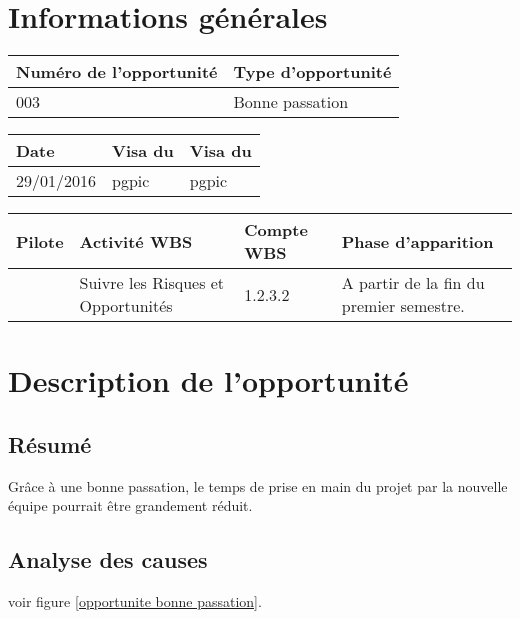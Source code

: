 \section*{Informations générales}
 
\begin{table}[h]
\centering
	\begin{tabularx}{16.8cm}{|X|X|}
	\hline
	\rowcolor{gray!40} Numéro de l'opportunité & Type d'opportunité \\
	\hline
	003 & Bonne passation \\
	\hline
	\end{tabularx}
\end{table}

\begin{table}[h]
\centering
	\begin{tabularx}{16.8cm}{|X|X|X|}
	\hline
	\rowcolor{gray!40} Date & Visa du \RQ & Visa du \CP \\
	\hline
	 29/01/2016 & pgpic & pgpic \\
	\hline
	\end{tabularx}
\end{table}

\begin{table}[h]
\centering
	\begin{tabularx}{16.8cm}{|X|X|X|X|}
	\hline
	\rowcolor{gray!40} Pilote & Activité WBS & Compte WBS & Phase d'apparition \\
	\hline
	 \Pierre & Suivre les Risques et Opportunités & 1.2.3.2 & A partir de la fin du premier semestre.\\
	\hline
	\end{tabularx}
\end{table}

\section*{Description de l'opportunité}

\subsection*{Résumé}
	Grâce à une bonne passation, le temps de prise en main du projet par la nouvelle équipe pourrait être grandement réduit.
	
\subsection*{Analyse des causes}
	voir figure \ref{opportunite bonne passation}.

